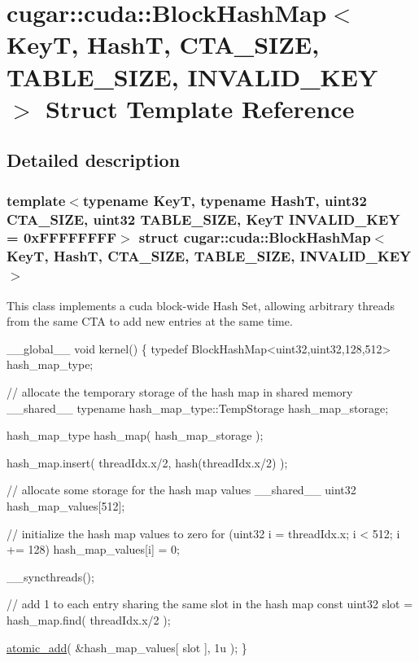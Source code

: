 \hypertarget{structcugar_1_1cuda_1_1_block_hash_map}{}\section{cugar\+:\+:cuda\+:\+:Block\+Hash\+Map$<$ KeyT, HashT, C\+T\+A\+\_\+\+S\+I\+ZE, T\+A\+B\+L\+E\+\_\+\+S\+I\+ZE, I\+N\+V\+A\+L\+I\+D\+\_\+\+K\+EY $>$ Struct Template Reference}
\label{structcugar_1_1cuda_1_1_block_hash_map}


\subsection{Detailed description}
\subsubsection*{template$<$typename KeyT, typename HashT, uint32 C\+T\+A\+\_\+\+S\+I\+ZE, uint32 T\+A\+B\+L\+E\+\_\+\+S\+I\+ZE, KeyT I\+N\+V\+A\+L\+I\+D\+\_\+\+K\+EY = 0x\+F\+F\+F\+F\+F\+F\+FF$>$\newline
struct cugar\+::cuda\+::\+Block\+Hash\+Map$<$ Key\+T, Hash\+T, C\+T\+A\+\_\+\+S\+I\+Z\+E, T\+A\+B\+L\+E\+\_\+\+S\+I\+Z\+E, I\+N\+V\+A\+L\+I\+D\+\_\+\+K\+E\+Y $>$}

This class implements a cuda block-\/wide Hash Set, allowing arbitrary threads from the same C\+TA to add new entries at the same time.


\begin{DoxyCode}
\_\_global\_\_ \textcolor{keywordtype}{void} kernel()
\{
   \textcolor{keyword}{typedef} BlockHashMap<uint32,uint32,128,512> hash\_map\_type;

   \textcolor{comment}{// allocate the temporary storage of the hash map in shared memory}
   \_\_shared\_\_ \textcolor{keyword}{typename} hash\_map\_type::TempStorage     hash\_map\_storage;

   hash\_map\_type hash\_map( hash\_map\_storage );

   hash\_map.insert( threadIdx.x/2, hash(threadIdx.x/2) );

   \textcolor{comment}{// allocate some storage for the hash map values}
   \_\_shared\_\_ uint32 hash\_map\_values[512];

   \textcolor{comment}{// initialize the hash map values to zero}
   \textcolor{keywordflow}{for} (uint32 i = threadIdx.x; i < 512; i += 128)
        hash\_map\_values[i] = 0;

   \_\_syncthreads();

   \textcolor{comment}{// add 1 to each entry sharing the same slot in the hash map}
   \textcolor{keyword}{const} uint32 slot = hash\_map.find( threadIdx.x/2 );

   \hyperlink{group___atomics_ga0c9d949be7ac5b6f27a232c7cd27a05c}{atomic\_add}( &hash\_map\_values[ slot ], 1u );
\}
\end{DoxyCode}
 


